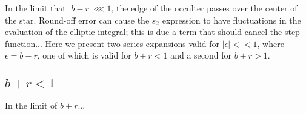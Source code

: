 \documentclass[modern]{aastex61}
\begin{document}
In the limit that $\vert b -r\vert \lll 1$, the edge of the occulter passes
over the center of the star.  Round-off error can cause the $s_2$ expression
to have fluctuations in the evaluation of the elliptic integral; this is
due a term that should cancel the step function...
Here we present two series expansions valid
for $\vert \epsilon \vert << 1$, where $\epsilon = b-r$, one of which is valid
for $b+r <1$ and a second for $b+r > 1$.

\subsection{$b+r <1$}

In the limit of $b+r$...



\end{document}
